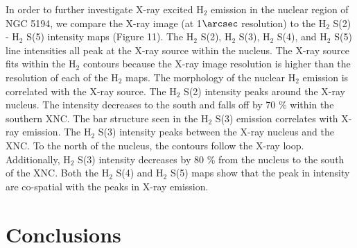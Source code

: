 \documentclass[manuscript]{aastex}
\begin{document}
In order to further investigate X-ray excited $\mathrm{H_2}$ emission in the nuclear region of NGC 5194, we compare the X-ray image (at 1$\arcsec$ resolution) to the $\mathrm{H_2}$ S(2) - $\mathrm{H_2}$ S(5) intensity maps (Figure 11).   The $\mathrm{H_2}$ S(2), $\mathrm{H_2}$ S(3), $\mathrm{H_2}$ S(4), and $\mathrm{H_2}$ S(5) line intensities all peak at the X-ray source within the nucleus.  The X-ray source fits within the $\mathrm{H_2}$ contours because the X-ray image resolution is higher than the resolution of each of the $\mathrm{H_2}$ maps.  The morphology of the nuclear $\mathrm{H_2}$ emission is correlated with the X-ray source.  The $\mathrm{H_2}$ S(2) intensity peaks around the X-ray nucleus.  The intensity decreases to the south and falls off by 70 \% within the southern XNC.  The bar structure seen in the $\mathrm{H_2}$ S(3) emission correlates with X-ray emission.  The $\mathrm{H_2}$ S(3) intensity peaks between the X-ray nucleus and the XNC.  To the north of the nucleus, the contours follow the X-ray loop.  Additionally, $\mathrm{H_2}$ S(3) intensity decreases by 80 \% from the nucleus to the south of the XNC.   Both the $\mathrm{H_2}$ S(4) and $\mathrm{H_2}$ S(5) maps show that the peak in intensity are co-spatial with the peaks in X-ray emission.  

\section{Conclusions}
\end{document}
